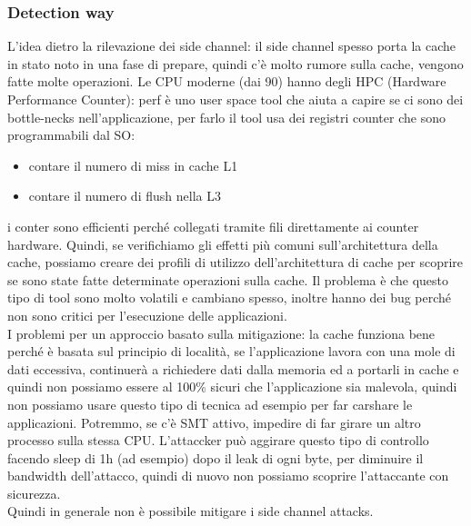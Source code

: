 \documentclass[12pt, oneside]{extbook} %
\begin{document}
\subsubsection{Detection way}
L'idea dietro la rilevazione dei side channel: il side channel spesso porta la cache in stato noto in una fase di prepare, quindi c'è molto rumore sulla cache, vengono fatte molte operazioni. Le CPU moderne (dai 90) hanno degli HPC (Hardware Performance Counter): perf è uno user space tool che aiuta a capire se ci sono dei bottle-necks nell'applicazione, per farlo il tool usa dei registri counter che sono programmabili dal SO:
\begin{itemize}
\item contare il numero di miss in cache L1
\item contare il numero di flush nella L3
\end{itemize}
i conter sono efficienti perché collegati tramite fili direttamente ai counter hardware. Quindi, se verifichiamo gli effetti più comuni sull'architettura della cache, possiamo creare dei profili di utilizzo dell'architettura di cache per scoprire se sono state fatte determinate operazioni sulla cache. Il problema è che questo tipo di tool sono molto volatili e cambiano spesso, inoltre hanno dei bug perché non sono critici per l'esecuzione delle applicazioni.\\ I problemi per un approccio basato sulla mitigazione: la cache funziona bene perché è basata sul principio di località, se l'applicazione lavora con una mole di dati eccessiva, continuerà a richiedere dati dalla memoria ed a portarli in cache e quindi non possiamo essere al 100\% sicuri che l'applicazione sia malevola, quindi non possiamo usare questo tipo di tecnica ad esempio per far carshare le applicazioni. Potremmo, se c'è SMT attivo, impedire di far girare un altro processo sulla stessa CPU. L'attaccker può aggirare questo tipo di controllo facendo sleep di 1h (ad esempio) dopo il leak di ogni byte, per diminuire il bandwidth dell'attacco, quindi di nuovo non possiamo scoprire l'attaccante con sicurezza.\\ Quindi in generale non è possibile mitigare i side channel attacks.
\end{document}
